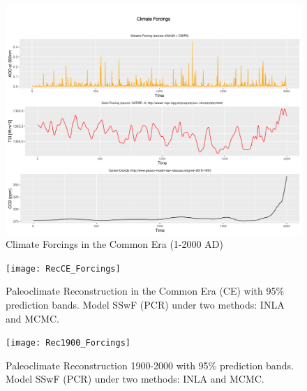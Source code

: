 \documentclass[11pt]{amsart}
\theoremstyle{plain}
\theoremstyle{definition}
\theoremstyle{remark}
\begin{document}
\begin{figure}[H]
  \centering
  \includegraphics[scale=0.35]{forcings}
  \caption{Climate Forcings in the Common Era (1-2000 AD)}
  \label{fig:forcings}
\end{figure}



\begin{figure}[H]
  \centering
  \texttt{[image: RecCE\_Forcings]}
  \caption{Paleoclimate Reconstruction in the Common Era (CE) with 95\%
    prediction bands. Model SSwF (PCR) under two methods: INLA and MCMC.}
  \label{fig:paleoCE4}
\end{figure}

\begin{figure}[H]
  \centering
  \texttt{[image: Rec1900\_Forcings]}
  \caption{Paleoclimate Reconstruction 1900-2000 with 95\%
    prediction bands. Model SSwF (PCR) under two methods: INLA and MCMC.}
  \label{fig:paleo19004}
\end{figure}
\end{document}
